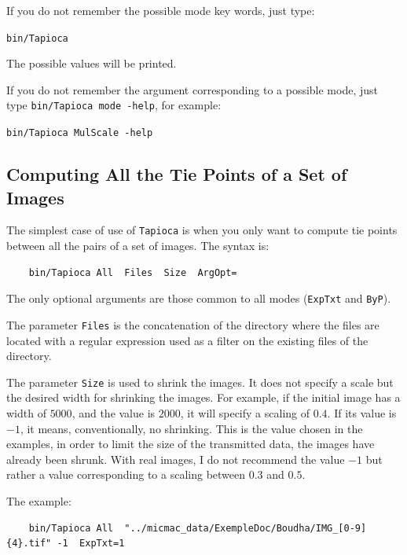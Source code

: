 If you do not remember the possible mode key words, just type:

\begin{center}
        {\tt bin/Tapioca}
\end{center}

The possible values will be printed.

If you do not remember the argument
corresponding to a possible mode, just type {\tt bin/Tapioca mode -help},
for example:

\begin{center}
        {\tt bin/Tapioca MulScale -help}
\end{center}




\subsection{Computing All the Tie Points of a Set of Images}

The simplest case of use of {\tt Tapioca} is when you only want to compute tie points
between all the pairs of a set of images. The syntax is:

{\scriptsize
\begin{verbatim}
    bin/Tapioca All  Files  Size  ArgOpt=
\end{verbatim}
}

The only optional arguments are those common to all modes ({\tt ExpTxt}  and {\tt ByP}).

The parameter {\tt Files} is the concatenation of the directory where the files
are located with a regular expression used as a filter on the existing files
of the directory.

The parameter {\tt Size} is used to shrink the images. It does not specify
a scale but the desired width for shrinking the images. For example, if the initial
image has a width of $5000$, and the value is $2000$, it will specify
a scaling of $0.4$. If its value is $-1$, it means, conventionally, no shrinking.
This is the value chosen in the examples, in order  to limit the size of the transmitted
data, the images have already been shrunk. With real images, I do not
recommend the value $-1$ but rather a value corresponding to a scaling
between $0.3$ and $0.5$.


The example:

{\scriptsize
\begin{verbatim}
    bin/Tapioca All  "../micmac_data/ExempleDoc/Boudha/IMG_[0-9]{4}.tif" -1  ExpTxt=1
\end{verbatim}
}

